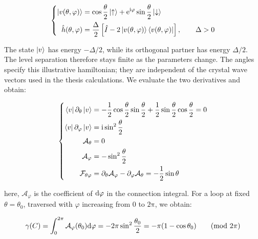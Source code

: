 \begin{equation}
\left\{\begin{aligned}
    \ket{v(\theta,\varphi)}
    &=\cos\frac{\theta}{2}\ket{\uparrow}
    +\mathrm{e}^{\mathrm{i}\varphi}\sin\frac{\theta}{2}\ket{\downarrow} \\
    \hat{h}(\theta,\varphi)
    &=\frac{\Delta}{2}\left[\hat{I}-2\ket{v(\theta,\varphi)}\bra{v(\theta,\varphi)}\right],
    \qquad \Delta>0
\end{aligned}\right.
\label{two_component_berry_state_appendix}
\end{equation}

The state $\ket{v}$ has energy $-\Delta/2$, while its orthogonal partner has energy $\Delta/2$.
The level separation therefore stays finite as the parameters change.
The angles specify this illustrative hamiltonian; they are independent of the crystal wave vectors used in the thesis calculations.
We evaluate the two derivatives and obtain:

\begin{equation}
\left\{\begin{aligned}
    \bra{v}\partial_\theta\ket{v}
    &=-\frac{1}{2}\cos\frac{\theta}{2}\sin\frac{\theta}{2}
    +\frac{1}{2}\sin\frac{\theta}{2}\cos\frac{\theta}{2}=0 \\
    \bra{v}\partial_\varphi\ket{v}
    &=\mathrm{i}\sin^2\frac{\theta}{2} \\
    \mathcal{A}_\theta&=0 \\
    \mathcal{A}_\varphi&=-\sin^2\frac{\theta}{2} \\
    \mathcal{F}_{\theta\varphi}
    &=\partial_\theta\mathcal{A}_\varphi-\partial_\varphi\mathcal{A}_\theta
    =-\frac{1}{2}\sin\theta
\end{aligned}\right.
\label{two_component_berry_derivatives_appendix}
\end{equation}

here, $\mathcal{A}_\varphi$ is the coefficient of $\mathrm{d}\varphi$ in the connection integral.
For a loop at fixed $\theta=\theta_0$, traversed with $\varphi$ increasing from $0$ to $2\mathrm{\pi}$, we obtain:

\begin{equation}
    \gamma(C)
    =\int_0^{2\mathrm{\pi}}\mathcal{A}_\varphi(\theta_0)\mathrm{d}\varphi
    =-2\mathrm{\pi}\sin^2\frac{\theta_0}{2}
    =-\mathrm{\pi}(1-\cos\theta_0)
    \qquad (\mathrm{mod}\ 2\mathrm{\pi})
\label{two_component_berry_phase_appendix}
\end{equation}

